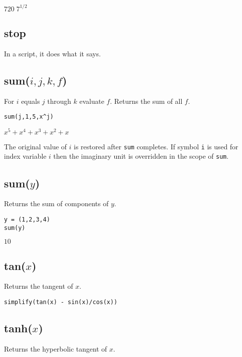 \noindent
$\displaystyle 720\; 7^{1/2}$

\subsection*{stop}

In a script, it does what it says.

\subsection*{sum($i,j,k,f$)}

For $i$ equals $j$ through $k$ evaluate $f$.
Returns the sum of all $f$.

{\color{blue}
\begin{verbatim}
sum(j,1,5,x^j)
\end{verbatim}
}

\noindent
$\displaystyle x^5+x^4+x^3+x^2+x$

\bigskip
\noindent
The original value of $i$ is restored after {\tt sum} completes.
If symbol {\tt i} is used for index variable $i$
then the imaginary unit is overridden in the scope of {\tt sum}.

\subsection*{sum($y$)}

Returns the sum of components of $y$.

{\color{blue}
\begin{verbatim}
y = (1,2,3,4)
sum(y)
\end{verbatim}
}

\noindent
$10$

\subsection*{tan($x$)}

Returns the tangent of $x$.

{\color{blue}
\begin{verbatim}
simplify(tan(x) - sin(x)/cos(x))
\end{verbatim}
}


\subsection*{tanh($x$)}

Returns the hyperbolic tangent of $x$.

